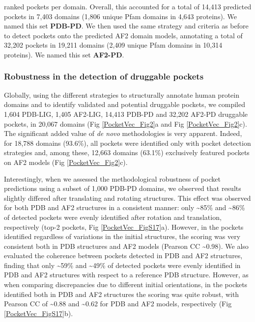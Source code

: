 ranked pockets per domain. Overall, this accounted for a total of 14,413 predicted pockets in 7,403 domains (1,806 unique Pfam domains in 4,643 proteins). We named this set \textbf{PDB-PD}. We then used the same strategy and criteria as before to detect pockets onto the predicted AF2 domain models, annotating a total of 32,202 pockets in 19,211 domains (2,409 unique Pfam domains in 10,314 proteins). We named this set \textbf{AF2-PD}.




\subsubsection{Robustness in the detection of druggable pockets}
\label{PocketVec_ResultsAndDiscussion_Robustness_Detection}

Globally, using the different strategies to structurally annotate human protein domains and to identify validated and potential druggable pockets, we compiled 1,604 PDB-LIG, 1,405 AF2-LIG, 14,413 PDB-PD and 32,202 AF2-PD druggable pockets, in 20,067 domains (Fig \ref{PocketVec_Fig2}a and Fig \ref{PocketVec_Fig2}c). The significant added value of \textit{de novo} methodologies is very apparent. Indeed, for 18,788 domains (93.6\%), all pockets were identified only with pocket detection strategies and, among these, 12,663 domains (63.1\%) exclusively featured pockets on AF2 models (Fig \ref{PocketVec_Fig2}c).

Interestingly, when we assessed the methodological robustness of pocket predictions using a subset of 1,000 PDB-PD domains, we observed that results slightly differed after translating and rotating structures. This effect was observed for both PDB and AF2 structures in a consistent manner: only \textasciitilde85\% and \textasciitilde86\% of detected pockets were evenly identified after rotation and translation, respectively (top-2 pockets, Fig \ref{PocketVec_FigS17}a). However, in the pockets identified regardless of variations in the initial structures, the scoring was very consistent both in PDB structures and AF2 models (Pearson CC \textasciitilde0.98). We also evaluated the coherence between pockets detected in PDB and AF2 structures, finding that only \textasciitilde59\% and \textasciitilde49\% of detected pockets were evenly identified in PDB and AF2 structures with respect to a reference PDB structure. However, as when comparing discrepancies due to different initial orientations, in the pockets identified both in PDB and AF2 structures the scoring was quite robust, with Pearson CC of \textasciitilde0.88 and \textasciitilde0.62 for PDB and AF2 models, respectively (Fig \ref{PocketVec_FigS17}b). 

